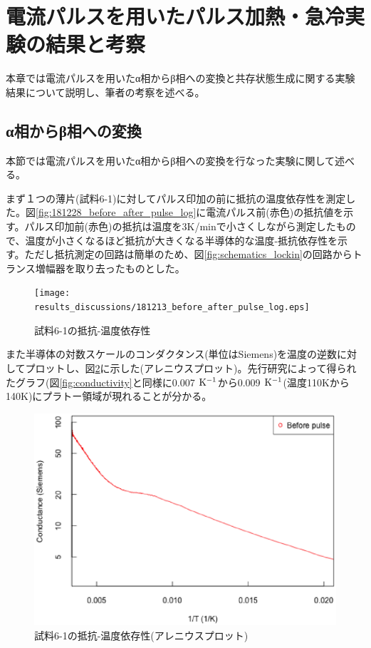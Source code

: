 \section{電流パルスを用いたパルス加熱・急冷実験の結果と考察}
本章では電流パルスを用いたα相からβ相への変換と共存状態生成に関する実験結果について説明し、筆者の考察を述べる。

\subsection{α相からβ相への変換}
本節では電流パルスを用いたα相からβ相への変換を行なった実験に関して述べる。

まず１つの薄片(試料6-1)に対してパルス印加の前に抵抗の温度依存性を測定した。図\ref{fig:181228_before_after_pulse_log}に電流パルス前(赤色)の抵抗値を示す。パルス印加前(赤色)の抵抗は温度を3K/minで小さくしながら測定したもので、温度が小さくなるほど抵抗が大きくなる半導体的な温度-抵抗依存性を示す。ただし抵抗測定の回路は簡単のため、図\ref{fig:schematics_lockin}の回路からトランス増幅器を取り去ったものとした。
\begin{figure}[!h]
    \begin{center}
   \texttt{[image: results\_discussions/181213\_before\_after\_pulse\_log.eps]}
  \end{center}
  \caption{試料6-1の抵抗-温度依存性}
  \label{fig:181213_before_after_pulse_log}
  \end{figure}
  
また半導体の対数スケールのコンダクタンス(単位はSiemens)を温度の逆数に対してプロットし、図\ref{fig:181213_before_pulse_Tinv}に示した(アレニウスプロット)。先行研究\cite{Kohnke}によって得られたグラフ(図\ref{fig:conductivity}と同様に0.007 $\rm  K^{-1}$から0.009 $\rm  K^{-1}$(温度110Kから140K)にプラトー領域が現れることが分かる。
\begin{figure}[!h]
    \begin{center}
   \includegraphics[width=0.8\hsize]{results_discussions/181213_before_pulse_Tinv.eps}
  \end{center}
  \caption{試料6-1の抵抗-温度依存性(アレニウスプロット)}
  \label{fig:181213_before_pulse_Tinv}
  \end{figure}

